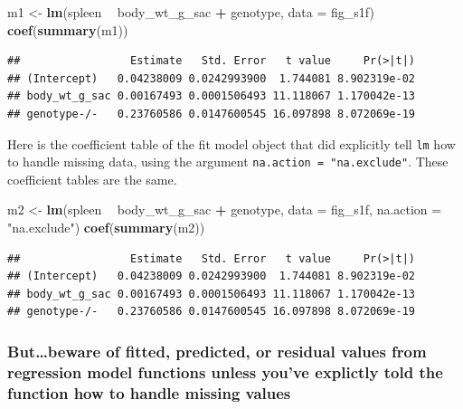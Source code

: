 \documentclass[]{book}
\newenvironment{Shaded}{\begin{snugshade}}{\end{snugshade}}
\newcommand{\DataTypeTok}[1]{\textcolor[rgb]{0.13,0.29,0.53}{#1}}
\newcommand{\KeywordTok}[1]{\textcolor[rgb]{0.13,0.29,0.53}{\textbf{#1}}}
\newcommand{\NormalTok}[1]{#1}
\newcommand{\OperatorTok}[1]{\textcolor[rgb]{0.81,0.36,0.00}{\textbf{#1}}}
\newcommand{\StringTok}[1]{\textcolor[rgb]{0.31,0.60,0.02}{#1}}
\begin{document}
\begin{Shaded}
\begin{Highlighting}[]
\NormalTok{m1 <-}\StringTok{ }\KeywordTok{lm}\NormalTok{(spleen }\OperatorTok{~}\StringTok{ }\NormalTok{body_wt_g_sac }\OperatorTok{+}\StringTok{ }\NormalTok{genotype,}
         \DataTypeTok{data =}\NormalTok{ fig_s1f)}
\KeywordTok{coef}\NormalTok{(}\KeywordTok{summary}\NormalTok{(m1))}
\end{Highlighting}
\end{Shaded}

\begin{verbatim}
##                 Estimate   Std. Error   t value     Pr(>|t|)
## (Intercept)   0.04238009 0.0242993900  1.744081 8.902319e-02
## body_wt_g_sac 0.00167493 0.0001506493 11.118067 1.170042e-13
## genotype-/-   0.23760586 0.0147600545 16.097898 8.072069e-19
\end{verbatim}

Here is the coefficient table of the fit model object that did explicitly tell \texttt{lm} how to handle missing data, using the argument \texttt{na.action\ =\ "na.exclude"}. These coefficient tables are the same.

\begin{Shaded}
\begin{Highlighting}[]
\NormalTok{m2 <-}\StringTok{ }\KeywordTok{lm}\NormalTok{(spleen }\OperatorTok{~}\StringTok{ }\NormalTok{body_wt_g_sac }\OperatorTok{+}\StringTok{ }\NormalTok{genotype,}
         \DataTypeTok{data =}\NormalTok{ fig_s1f,}
         \DataTypeTok{na.action =} \StringTok{"na.exclude"}\NormalTok{)}
\KeywordTok{coef}\NormalTok{(}\KeywordTok{summary}\NormalTok{(m2))}
\end{Highlighting}
\end{Shaded}

\begin{verbatim}
##                 Estimate   Std. Error   t value     Pr(>|t|)
## (Intercept)   0.04238009 0.0242993900  1.744081 8.902319e-02
## body_wt_g_sac 0.00167493 0.0001506493 11.118067 1.170042e-13
## genotype-/-   0.23760586 0.0147600545 16.097898 8.072069e-19
\end{verbatim}

\hypertarget{butbeware-of-fitted-predicted-or-residual-values-from-regression-model-functions-unless-youve-explictly-told-the-function-how-to-handle-missing-values}{%
\subsubsection{But\ldots beware of fitted, predicted, or residual values from regression model functions unless you've explictly told the function how to handle missing values}\label{butbeware-of-fitted-predicted-or-residual-values-from-regression-model-functions-unless-youve-explictly-told-the-function-how-to-handle-missing-values}}
\end{document}
